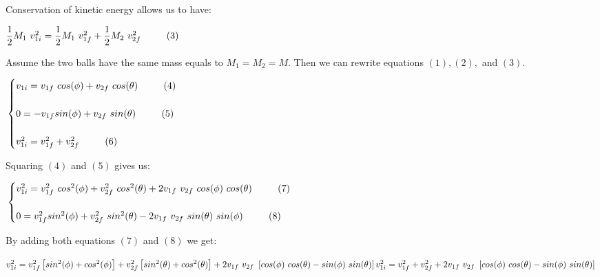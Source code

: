 \documentclass[fleqn]{article}
\begin{document}
  \pagebreak

  Conservation of kinetic energy allows us to have:

  $
    \\
    \dfrac{1}{2} M_1 ~ v_{1i}^2=\dfrac{1}{2} M_1 ~ v_{1f}^2+\dfrac{1}{2} M_2 ~ v_{2f}^2 ~~~~~~~~ (3)
  $

  \vspace{10px}

  Assume the two balls have the same mass equals to $M_1=M_2=M$. Then we can rewrite equations $(1), (2),$ and $(3)$.

  $
    \\
    \begin{cases}
      v_{1i}=v_{1f} ~ cos(\phi)+v_{2f} ~ cos(\theta) ~~~~~~~~ (4)
      \\
      \\
      0=-v_{1f} sin(\phi)+v_{2f} ~ sin(\theta) ~~~~~~~~ (5)
      \\
      \\
      v_{1i}^2=v_{1f}^2+v_{2f}^2 ~~~~~~~~ (6)
    \end{cases}
    \\
    \\
  $

  Squaring $(4)$ and $(5)$ gives us:

  $
    \\
    \begin{cases}
      v_{1i}^2=v_{1f}^2 ~ cos^2(\phi)+v_{2f}^2 ~ cos^2(\theta)+2 v_{1f} ~ v_{2f} ~ cos(\phi) ~ cos(\theta) ~~~~~~~~ (7)
      \\
      \\
      0=v_{1f}^2 sin^2(\phi)+v_{2f}^2 ~ sin^2(\theta)-2 v_{1f} ~ v_{2f} ~ sin(\theta) ~ sin(\phi) ~~~~~~~~ (8)
    \end{cases}
    \\
    \\
  $

  By adding both equations $(7)$ and $(8)$ we get:

  $
    \\
    v_{1i}^2=v_{1f}^2 \left[sin^2(\phi)+cos^2(\phi)\right]+v_{2f}^2 \left[sin^2(\theta)+cos^2(\theta)\right]
    +2 v_{1f} ~ v_{2f} ~ \left[cos(\phi) ~ cos(\theta)-sin(\phi) ~ sin(\theta)\right]
    \\
    \\
    v_{1i}^2=v_{1f}^2+v_{2f}^2+2 v_{1f} ~ v_{2f} ~ \left[cos(\phi) ~ cos(\theta)-sin(\phi) ~ sin(\theta)\right]
    \\
    \\
  $
\end{document}
